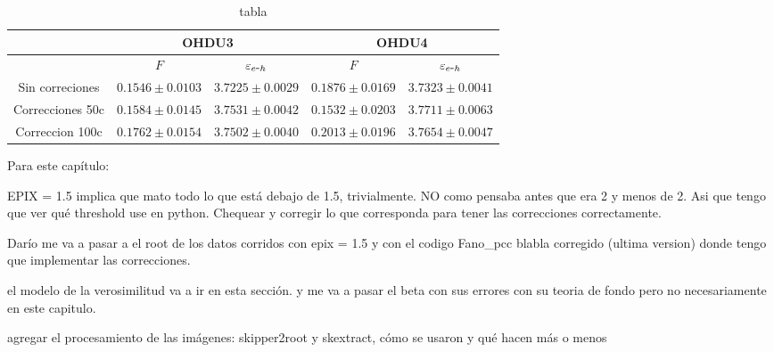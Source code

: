 \begin{table}[]
\begin{tabular}{@{}ccccc@{}}
\toprule
                & \multicolumn{2}{c}{OHDU3}                 & \multicolumn{2}{c}{OHDU4}                 \\ \midrule
                & $F$                 & $\varepsilon_{e\mbox{-}h}$ & $F$                 & $\varepsilon_{e\mbox{-}h}$ \\
Sin correciones & $0.1546 \pm 0.0103$ & $3.7225 \pm 0.0029$ & $0.1876 \pm 0.0169$ & $3.7323 \pm 0.0041$ \\
Correcciones 50c & $0.1584 \pm 0.0145$ & $3.7531 \pm 0.0042$ & $0.1532 \pm 0.0203$ & $3.7711 \pm 0.0063$ \\
Correccion 100c & $0.1762 \pm 0.0154$ & $3.7502 \pm 0.0040$ & $0.2013 \pm 0.0196$ & $3.7654 \pm 0.0047$ \\ \bottomrule
\end{tabular}
\caption{tabla}
\label{tab:Correciones4}
\end{table}
Para este capítulo:

EPIX = 1.5 implica que mato todo lo que está debajo de 1.5, trivialmente. NO como pensaba antes que era 2 y menos de 2. Asi que tengo que ver qué threshold use en python. Chequear y corregir lo que corresponda para tener las correcciones correctamente.

Darío me va a pasar a el root de los datos corridos con epix = 1.5 y con el codigo Fano\_pcc blabla corregido (ultima version) donde tengo que implementar las correcciones.

el modelo de la verosimilitud va a ir en esta sección. y me va a pasar el beta con sus errores con su teoria de fondo pero no necesariamente en este capitulo.

agregar el procesamiento de las imágenes: skipper2root y skextract, cómo se usaron y qué hacen más o menos

